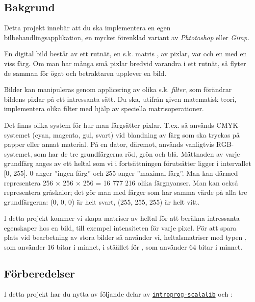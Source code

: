 

\subsection{Bakgrund}
Detta projekt innebär att du ska implementera en egen bilbehandlingsapplikation, en mycket förenklad variant av \emph{Phtotoshop} eller \emph{Gimp}. 

En digital bild består av ett rutnät, en s.k. matris , av pixlar, var och en med en viss färg. Om man har många små pixlar bredvid varandra i ett rutnät, så flyter de samman för ögat och betraktaren upplever en bild.

Bilder kan manipuleras genom applicering av olika s.k. \emph{filter}, som förändrar bildens pixlar på ett intressanta sätt. Du ska, utifrån given matematisk teori, implementera olika filter med hjälp av speciella matrisoperationer.


Det finns olika system för hur man färgsätter pixlar. T.ex. så används CMYK-systemet (cyan, magenta, gul, svart) vid blandning av färg som ska tryckas på papper eller annat material. På en dator, däremot, används vanligtvis RGB-systemet, som har de tre grundfärgerna röd, grön och blå. Mättnaden av varje grundfärg anges av ett heltal som vi i fortsättningen förutsätter ligger i intervallet [0, 255]. 0 anger ''ingen färg'' och 255 anger ''maximal färg''. Man kan därmed representera 256 × 256 × 256 = 16 777 216 olika färgnyanser. Man kan också representera gråskalor; det gör man med färger som har samma värde på alla tre 
grundfärgerna: (0, 0, 0) är helt svart, (255, 255, 255) är helt vitt. 

I detta projekt kommer vi skapa matriser av heltal för att beräkna intressanta egenskaper hos en bild, till exempel intensiteten för varje pixel. 
För att spara plats vid bearbetning av stora bilder så använder vi, heltalsmatriser med typen , som använder 16 bitar i minnet, i ståället för , som använder 64 bitar i minnet. 

\subsection{Förberedelser}

I detta projekt har du nytta av följande delar av \href{https://github.com/lunduniversity/introprog-scalalib}{\texttt{introprog-scalalib}} och :

